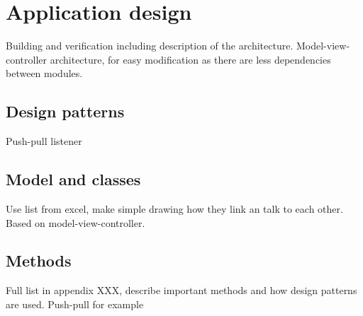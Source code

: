 \chapter{Application design}
Building and verification including description of the architecture. Model-view-controller architecture, for easy modification as there are less dependencies between modules.

\section{Design patterns}
Push-pull listener

\section{Model and classes}
Use list from excel, make simple drawing how they link an talk to each other. Based on model-view-controller.

\section{Methods}
Full list in appendix XXX, describe important methods and how design patterns are used. Push-pull for example
